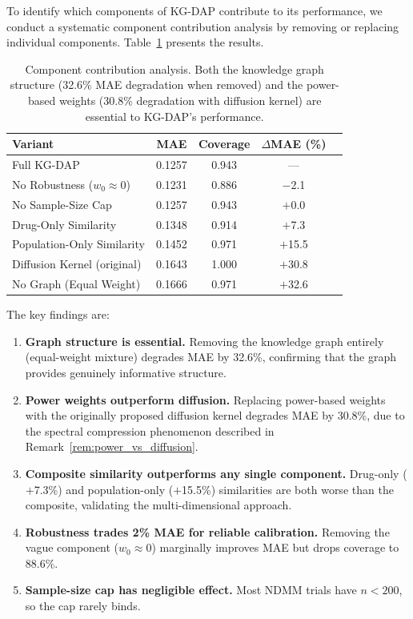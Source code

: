 \documentclass[12pt]{article}
\begin{document}
To identify which components of KG-DAP contribute to its performance, we conduct a systematic component contribution analysis by removing or replacing individual components. Table~\ref{tab:ablation} presents the results.

\begin{table}[t]
\centering
\caption{Component contribution analysis. Both the knowledge graph structure (32.6\% MAE degradation when removed) and the power-based weights (30.8\% degradation with diffusion kernel) are essential to KG-DAP's performance.}
\label{tab:ablation}
\begin{tabular}{lcccc}
\toprule
Variant & MAE & Coverage & $\Delta$MAE (\%) \\
\midrule
Full KG-DAP                   & 0.1257 & 0.943 & ---      \\
No Robustness ($w_0 \approx 0$) & 0.1231 & 0.886 & $-$2.1  \\
No Sample-Size Cap            & 0.1257 & 0.943 & $+$0.0  \\
Drug-Only Similarity          & 0.1348 & 0.914 & $+$7.3  \\
Population-Only Similarity    & 0.1452 & 0.971 & $+$15.5 \\
Diffusion Kernel (original)   & 0.1643 & 1.000 & $+$30.8 \\
No Graph (Equal Weight)       & 0.1666 & 0.971 & $+$32.6 \\
\bottomrule
\end{tabular}
\end{table}

The key findings are:

\begin{enumerate}
\item \textbf{Graph structure is essential.} Removing the knowledge graph entirely (equal-weight mixture) degrades MAE by 32.6\%, confirming that the graph provides genuinely informative structure.

\item \textbf{Power weights outperform diffusion.} Replacing power-based weights with the originally proposed diffusion kernel degrades MAE by 30.8\%, due to the spectral compression phenomenon described in Remark~\ref{rem:power_vs_diffusion}.

\item \textbf{Composite similarity outperforms any single component.} Drug-only ($+$7.3\%) and population-only ($+$15.5\%) similarities are both worse than the composite, validating the multi-dimensional approach.

\item \textbf{Robustness trades 2\% MAE for reliable calibration.} Removing the vague component ($w_0 \approx 0$) marginally improves MAE but drops coverage to 88.6\%.

\item \textbf{Sample-size cap has negligible effect.} Most NDMM trials have $n < 200$, so the cap rarely binds.
\end{enumerate}
\end{document}
